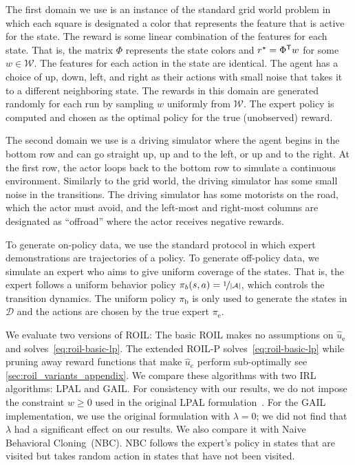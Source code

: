 \documentclass[10pt]{article}
\renewcommand{\cite}{\citep}
\theoremstyle{plain}
\theoremstyle{remark}
\begin{document}
The first domain we use is an instance of the standard grid world problem in which each square is designated a color that represents the feature that is active for the state. The reward is some linear combination of the features for each state. That is, the matrix $\Phi$ represents the state colors and  $r^{\mathnormal{\star}}  = \Phi^{\mathsf{T}} w$ for some $w \in \mathcal{W}$. The features for each action in the state are identical. The agent has a choice of up, down, left, and right as their actions with small noise that takes it to a different neighboring state. The rewards in this domain are generated randomly for each run by sampling $w$ uniformly from $\mathcal{W}$. The expert policy is computed and chosen as the optimal policy for the true (unobserved) reward.

The second domain we use is a driving simulator where the agent begins in the bottom row and can go straight up, up and to the left, or up and to the right. At the first row, the actor loops back to the bottom row to simulate a continuous environment. Similarly to the grid world, the driving simulator has some small noise in the transitions. The driving simulator has some motorists on the road, which the actor must avoid, and the left-most and right-most columns are designated as ``offroad'' where the actor receives negative rewards.

To generate on-policy data, we use the standard protocol in which expert demonstrations are trajectories of a policy. To generate off-policy data, we simulate an expert who aims to give uniform coverage of the states. That is, the expert follows a uniform behavior policy  $\pi_b(s,a) = \nicefrac{1}{\lvert \mathcal{A} \rvert}$, which controls the transition dynamics. The uniform policy $\pi_{\mathrm{b}}$ is only used to generate the states in $\mathcal{D}$ and the actions are chosen by the true expert $\pi_{\mathrm{e}}$.


We evaluate two versions of ROIL: The basic ROIL makes no assumptions on $\hat{u}_{\mathrm{e}}$ and solves~\eqref{eq:roil-basic-lp}. The extended ROIL-P solves~\eqref{eq:roil-basic-lp} while pruning away reward functions that make $\hat{u}_e$ perform sub-optimally see \cref{sec:roil_variants_appendix}. We compare these algorithms with two IRL algorithms: LPAL and GAIL. For consistency with our results, we do not impose the constraint $w \ge 0$ used in the original LPAL formulation~\cite{Syed2008}. For the GAIL implementation, we use the original formulation with $\lambda = 0$; we did not find that $\lambda$ had a significant effect on our results. We also compare it with Naive Behavioral Cloning~(NBC). NBC follows the expert's policy in states that are visited but takes random action in states that have not been visited.
\end{document}
